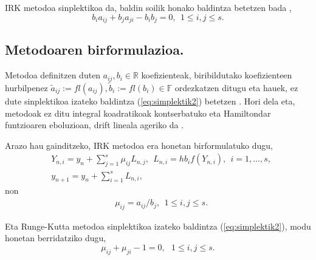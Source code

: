 IRK metodoa sinplektikoa da, baldin soilik honako baldintza betetzen bada  \cite{JMSanz-Serna1994} ,
\begin{equation}
\label{eq:simplektik2}
b_{i}a_{ij}+b_{j}a_{ji}-b_{i}b_{j}=0, \ \ 1 \leqslant i,j \leqslant s.
\end{equation}   

\subsection{Metodoaren birformulazioa.}

Metodoa definitzen duten $a_{ij},b_i  \in \mathbb{R}$ koefizienteak, biribildutako koefizienteen hurbilpenez $\tilde a_{ij}:=fl(a_{ij}),\tilde b_i:=fl(b_i) \in \mathbb{F}$  ordezkatzen ditugu eta hauek, ez dute sinplektikoa izateko baldintza (\ref{eq:simplektik2}) betetzen . Hori dela eta, metodoak ez ditu integral koadratikoak kontserbatuko eta Hamiltondar funtzioaren eboluzioan, drift lineala ageriko da \cite{JMSanz-Serna1994}.    
  
Arazo hau gainditzeko, IRK metodoa era honetan birformulatuko dugu,
\begin{align}
\label{eq:irk1}
&Y_{n,i}=y_n+ \sum\limits_{j=1}^{s} \mu_{ij} L_{n,j},  \ \ L_{n,i}=hb_if(Y_{n,i}), \ \ i=1,\dots,s,\\
\label{eq:irk2}
&y_{n+1}=y_n+\sum\limits_{i=1}^{s} L_{n,i},
\end{align}
non 
\begin{align*}
&\mu_{ij}=a_{ij}/{b_j}, \ \ 1 \leqslant i,j \leqslant s.
\end{align*}

Eta Runge-Kutta metodoa sinplektikoa izateko baldintza (\ref{eq:simplektik2}), modu honetan berridatziko dugu,
\begin{equation}
\label{eq:sinplekmij}
\mu_{ij}+\mu_{ji}-1=0, \ \ \ 1 \leqslant i,j \leqslant s.
\end{equation}
 
